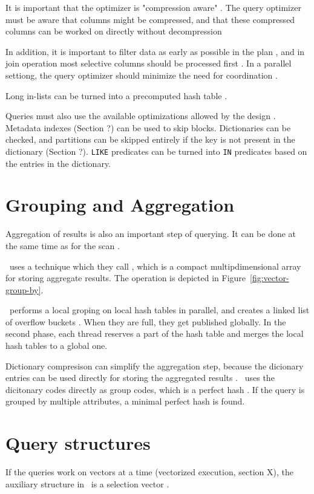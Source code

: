 It is important that the optimizer is "compression aware" \cite{Westmann200-mz}. The query optimizer must be aware that columns might be compressed, and that these compressed columns can be worked on directly without decompression \cite{Stonebraker2005-qz}

In addition, it is important to filter data as early as possible in the plan \cite{Lamb2012-kg}, and in join operation  most selective columns should be processed first \cite{Holloway2008-rr}. In a parallel settiong, the query optimizer should minimize the need for coordination \cite{Exasol2014-xh}.

Long in-lists can be turned into a precomputed hash table \cite{Raman2013-em}.

Queries must also use the available optimizations allowed by the design \cite{Barber2012-xt}. Metadata indexes (Section ?) can be used to skip blocks. Dictionaries can be checked, and partitions can be skipped entirely if the key is not present in the dictionary (Section ?). \texttt{LIKE} predicates can be turned into \texttt{IN} predicates based on the entries in the dictionary.

\section{Grouping and Aggregation}
\label{sec:Grouping and Aggregation}
Aggregation of results is also an important step of querying. It can be done at the same time as for the scan \cite{Leme2010-is}.

\oracle~uses a technique which they call , which is a compact multipdimensional array for storing aggregate results. The operation is depicted in Figure~\ref{fig:vector-group-by}.

\ibm~performs a local groping on local hash tables in parallel, and creates a linked list of overflow buckets \cite{Raman2013-em}. When they are full, they get published globally. In the second phase, each thread reserves a part of the hash table and merges the local hash tables to a global one.

Dictionary compresison can simplify the aggregation step, because the dicionary entries can be used directly for storing the aggregated results \cite{Lemke2010-is, Boncz2005-wj}. \blink~uses the dicitonary codes directly as group codes, which is a perfect hash \cite{Raman2008-gi}. If the query is grouped by multiple attributes, a minimal perfect hash is found. 

\section{Query structures}
\label{sec:Query structures}
If the queries work on vectors at a time (vectorized execution, section X), the auxiliary structure in \monetx~is a selection vector \cite{Boncz2005-wj}.



